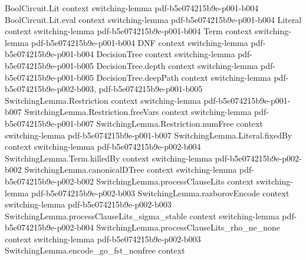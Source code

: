 \begin{lemma}
\label{SwitchingLemma.encode_go_not_kills_first_clause}
\leanok
{}
\proofstep
  {BoolCircuit.Lit}
  {context}
  {switching-lemma}
  {pdf-b5e074215b9e-p001-b004}
\proofstep
  {BoolCircuit.Lit.eval}
  {context}
  {switching-lemma}
  {pdf-b5e074215b9e-p001-b004}
\proofstep
  {Literal}
  {context}
  {switching-lemma}
  {pdf-b5e074215b9e-p001-b004}
\proofstep
  {Term}
  {context}
  {switching-lemma}
  {pdf-b5e074215b9e-p001-b004}
\proofstep
  {DNF}
  {context}
  {switching-lemma}
  {pdf-b5e074215b9e-p001-b004}
\proofstep
  {DecisionTree}
  {context}
  {switching-lemma}
  {pdf-b5e074215b9e-p001-b005}
\proofstep
  {DecisionTree.depth}
  {context}
  {switching-lemma}
  {pdf-b5e074215b9e-p001-b005}
\proofstep
  {DecisionTree.deepPath}
  {context}
  {switching-lemma}
  {pdf-b5e074215b9e-p002-b003,
    pdf-b5e074215b9e-p001-b005}
\proofstep
  {SwitchingLemma.Restriction}
  {context}
  {switching-lemma}
  {pdf-b5e074215b9e-p001-b007}
\proofstep
  {SwitchingLemma.Restriction.freeVars}
  {context}
  {switching-lemma}
  {pdf-b5e074215b9e-p001-b007}
\proofstep
  {SwitchingLemma.Restriction.numFree}
  {context}
  {switching-lemma}
  {pdf-b5e074215b9e-p001-b007}
\proofstep
  {SwitchingLemma.Literal.fixedBy}
  {context}
  {switching-lemma}
  {pdf-b5e074215b9e-p002-b004}
\proofstep
  {SwitchingLemma.Term.killedBy}
  {context}
  {switching-lemma}
  {pdf-b5e074215b9e-p002-b002}
\proofstep
  {SwitchingLemma.canonicalDTree}
  {context}
  {switching-lemma}
  {pdf-b5e074215b9e-p002-b002}
\proofstep
  {SwitchingLemma.processClauseLits}
  {context}
  {switching-lemma}
  {pdf-b5e074215b9e-p002-b003}
\proofstep
  {SwitchingLemma.razborovEncode}
  {context}
  {switching-lemma}
  {pdf-b5e074215b9e-p002-b003}
\proofstep
  {SwitchingLemma.processClauseLits_sigma_stable}
  {context}
  {switching-lemma}
  {pdf-b5e074215b9e-p002-b004}
\proofstep
  {SwitchingLemma.processClauseLits_rho_ne_none}
  {context}
  {switching-lemma}
  {pdf-b5e074215b9e-p002-b003}
\proofstep
  {SwitchingLemma.encode_go_fst_nonfree}
  {context}

\end{lemma}

